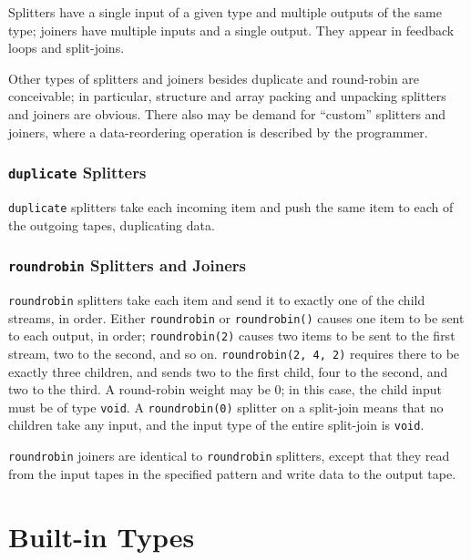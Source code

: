 \documentclass[11pt]{article}
\begin{document}
Splitters have a single input of a given type and multiple outputs of
the same type; joiners have multiple inputs and a single output.  They
appear in feedback loops and split-joins.

\begin{note}
  Other types of splitters and joiners besides duplicate and
  round-robin are conceivable; in particular, structure and array
  packing and unpacking splitters and joiners are obvious.  There also
  may be demand for ``custom'' splitters and joiners, where a
  data-reordering operation is described by the programmer.
\end{note}

\subsubsection{\lstinline|duplicate| Splitters}
\label{sec:expr-duplicate}

\lstinline|duplicate| splitters take each incoming item and push the
same item to each of the outgoing tapes, duplicating data.

\subsubsection{\lstinline|roundrobin| Splitters and Joiners}
\label{sec:expr-round-robin}

\lstinline|roundrobin| splitters take each item and send it to exactly
one of the child streams, in order.  Either \lstinline|roundrobin| or
\lstinline|roundrobin()| causes one item to be sent to each output, in
order; \lstinline|roundrobin(2)| causes two items to be sent to the first
stream, two to the second, and so on.  \lstinline|roundrobin(2, 4, 2)|
requires there to be exactly three children, and sends two to the
first child, four to the second, and two to the third.  A round-robin
weight may be 0; in this case, the child input must be of type
\lstinline|void|.  A \lstinline|roundrobin(0)| splitter on a
split-join means that no children take any input, and the input type
of the entire split-join is \lstinline|void|.

\lstinline|roundrobin| joiners are identical to \lstinline|roundrobin|
splitters, except that they read from the input tapes in the specified
pattern and write data to the output tape.


\section{Built-in Types}
\end{document}
